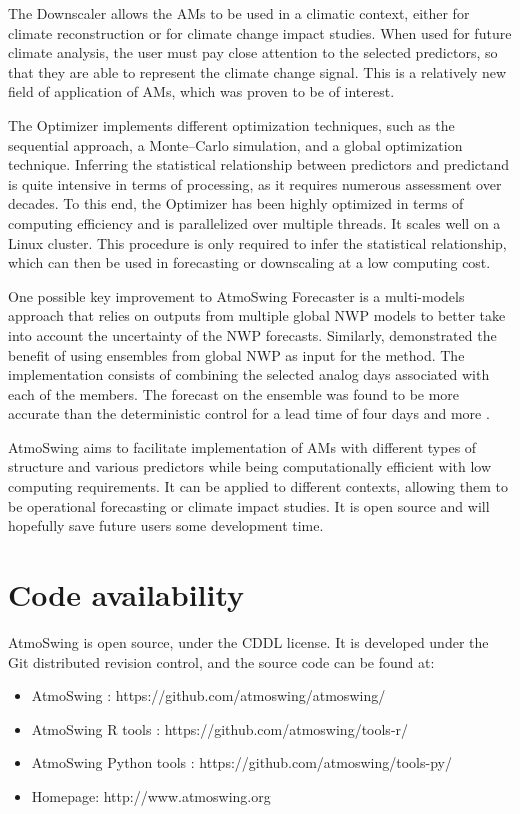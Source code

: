 \documentclass[review]{elsarticle}
\begin{document}
The Downscaler allows the AMs to be used in a climatic context, either for climate reconstruction or for climate change impact studies. When used for future climate analysis, the user must pay close attention to the selected predictors, so that they are able to represent the climate change signal. This is a relatively new field of application of AMs, which was proven to be of interest.

The Optimizer implements different optimization techniques, such as the sequential approach, a Monte--Carlo simulation, and a global optimization technique. Inferring the statistical relationship between predictors and predictand is quite intensive in terms of processing, as it requires numerous assessment over decades. To this end, the Optimizer has been highly optimized in terms of computing efficiency and is parallelized over multiple threads. It scales well on a Linux cluster. This procedure is only required to infer the statistical relationship, which can then be used in forecasting or downscaling at a low computing cost. 

One possible key improvement to AtmoSwing Forecaster is a multi-models approach that relies on outputs from multiple global NWP models to better take into account the uncertainty of the NWP forecasts. Similarly, \citet{Thevenot2004} demonstrated the benefit of using ensembles from global NWP as input for the method. The implementation consists of combining the selected analog days associated with each of the members. The forecast on the ensemble was found to be more accurate than the deterministic control for a lead time of four days and more \citep{Thevenot2004}. 

AtmoSwing aims to facilitate implementation of AMs with different types of structure and various predictors while being computationally efficient with low computing requirements. It can be applied to different contexts, allowing them to be operational forecasting or climate impact studies. It is open source and will hopefully save future users some development time.


\section*{Code availability}

AtmoSwing is open source, under the CDDL license. It is developed under the Git distributed revision control, and the source code can be found at:

\begin{itemize}
	\item AtmoSwing \citep{Horton2018c}: https://github.com/atmoswing/atmoswing/
	\item AtmoSwing R tools \citep{Horton2018d}: https://github.com/atmoswing/tools-r/
	\item AtmoSwing Python tools \citep{Horton2018e}: https://github.com/atmoswing/tools-py/
	\item Homepage: http://www.atmoswing.org
\end{itemize}
\end{document}
